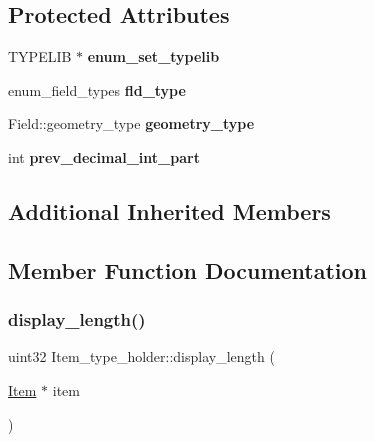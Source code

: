 \subsection*{Protected Attributes}
\begin{DoxyCompactItemize}
\item 
\mbox{\label{classItem__type__holder_a34a1a4fc6d33579228c9d081a2156c1b}} 
T\+Y\+P\+E\+L\+IB $\ast$ {\bfseries enum\+\_\+set\+\_\+typelib}
\item 
\mbox{\label{classItem__type__holder_a594e6472ceafc75588c13be58f89bbd1}} 
enum\+\_\+field\+\_\+types {\bfseries fld\+\_\+type}
\item 
\mbox{\label{classItem__type__holder_a94630f53468d9a16f456cd07c050118e}} 
Field\+::geometry\+\_\+type {\bfseries geometry\+\_\+type}
\item 
\mbox{\label{classItem__type__holder_a9e96e3bde999c9a27adbd0dcba114043}} 
int {\bfseries prev\+\_\+decimal\+\_\+int\+\_\+part}
\end{DoxyCompactItemize}
\subsection*{Additional Inherited Members}


\subsection{Member Function Documentation}
\mbox{\label{classItem__type__holder_a8e24b0ff0b67f0be64bffbbefa6dcf96}} 
\subsubsection{\texorpdfstring{display\+\_\+length()}{display\_length()}}
{\footnotesize\ttfamily uint32 Item\+\_\+type\+\_\+holder\+::display\+\_\+length (\begin{DoxyParamCaption}\item[{\mbox{\hyperlink{classItem}{Item}} $\ast$}]{item }\end{DoxyParamCaption})\hspace{0.3cm}{\ttfamily [static]}}

